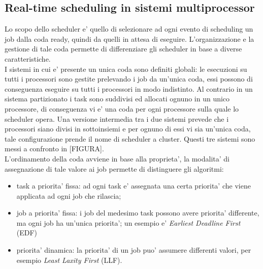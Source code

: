 \subsection{Real-time scheduling in sistemi multiprocessor}
\label{sec:SchedMulti}

Lo scopo dello scheduler e' quello di selezionare ad ogni evento di scheduling un job dalla coda ready, quindi da quelli in attesa di eseguire. L'organizzazione e la gestione di tale coda permette di differenziare gli scheduler in base a diverse caratteristiche.\\

I sistemi in cui e' presente un unica coda sono definiti globali: le esecuzioni su tutti i processori sono gestite prelevando i job da un'unica coda, essi possono di conseguenza eseguire su tutti i processori in modo indistinto. Al contrario in un sistema partizionato i task sono suddivisi ed allocati ognuno in un unico processore, di conseguenza vi e' una coda per ogni processore sulla quale lo scheduler opera. Una versione intermedia tra i due sistemi prevede che i processori siano divisi in sottoinsiemi e per ognuno di essi vi sia un'unica coda, tale configurazione prende il nome di scheduler a cluster. Questi tre sistemi sono messi a confronto in [FIGURA].\\

L'ordinamento della coda avviene in base alla proprieta', la modalita' di assegnazione di tale valore ai job permette di distinguere gli algoritmi:

\begin{itemize}
	\item task a priorita' fissa: ad ogni task e' assegnata una certa priorita' che viene applicata ad ogni job che rilascia;
	\item job a priorita' fissa: i job del medesimo task possono avere priorita' differente, ma ogni job ha un'unica priorita'; un esempio e' \textit{Earliest Deadline First} (EDF)
	\item priorita' dinamica: la priorita' di un job puo' assumere differenti valori, per esempio \textit{Least Laxity First} (LLF).
\end{itemize}

